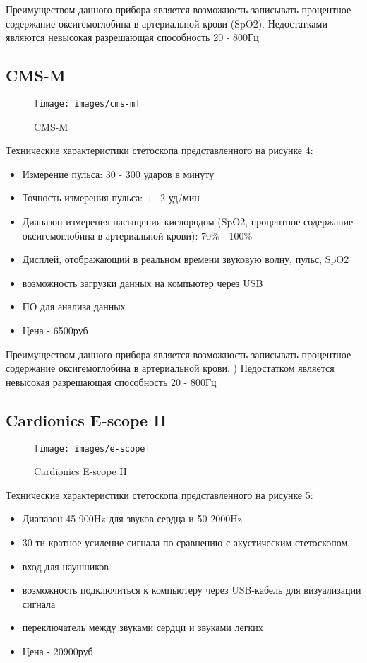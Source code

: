 \documentclass[../main.tex]{subfiles}
\begin{document}
Преимуществом данного прибора является возможность записывать процентное содержание оксигемоглобина в артериальной крови (SpO2). Недостатками являются невысокая разрешающая способность 20 - 800Гц

\subsection{CMS-M}
\begin{figure}[H]
\centering
\texttt{[image: images/cms-m]}
\caption{CMS-M}
\end{figure}

Технические характеристики \cite{cms-m} стетоскопа представленного на рисунке 4:
\begin{itemize}
  \item Измерение пульса: 30 - 300 ударов в минуту
  \item Точность измерения пульса: +- 2 уд/мин
  \item Диапазон измерения насыщения кислородом (SpO2, процентное содержание оксигемоглобина в артериальной крови): 70\% - 100\%
  \item Дисплей, отображающий в реальном времени звуковую волну, пульс, SpO2
  \item возможность загрузки данных на компьютер через USB
  \item ПО для анализа данных
  \item Цена - 6500руб
\end{itemize}

Преимуществом данного прибора является возможность записывать процентное содержание оксигемоглобина в артериальной крови. ) Недостатком является невысокая разрешающая способность 20 - 800Гц

\subsection{Cardionics E-scope II}
\begin{figure}[H]
\centering
\texttt{[image: images/e-scope]}
\caption{Cardionics E-scope II}
\end{figure}

Технические характеристики \cite{cardioics} стетоскопа представленного на рисунке 5:
\begin{itemize}
  \item Диапазон 45-900Hz для звуков сердца и 50-2000Hz
  \item 30-ти кратное усиление сигнала по сравнению с акустическим стетоскопом.
  \item вход для наушников
  \item возможность подключиться к компьютеру через USB-кабель для визуализации сигнала
  \item переключатель между звуками сердци и звуками легких
  \item Цена - 20900руб
\end{itemize}
\end{document}
